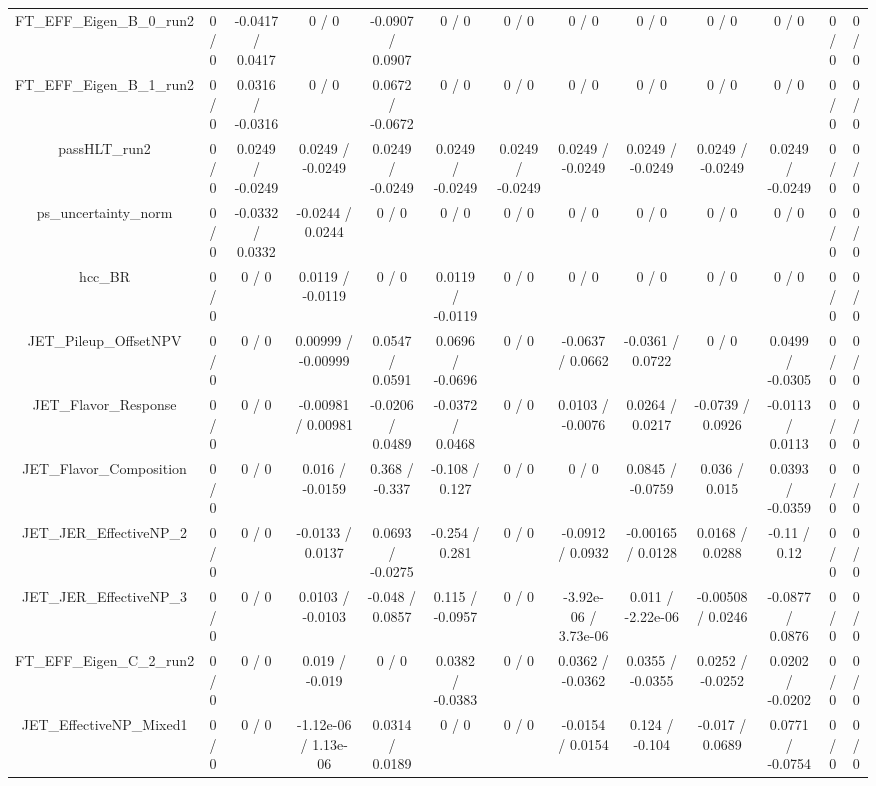 \documentclass[10pt]{article}
\begin{document}
\begin{table}[htbp]
\begin{center}
\begin{tabular}{|c|c|c|c|c|c|c|c|c|c|c|c|c|}
  FT_EFF_Eigen_B_0_run2 & 0 / 0 & -0.0417 / 0.0417 & 0 / 0 & -0.0907 / 0.0907 & 0 / 0 & 0 / 0 & 0 / 0 & 0 / 0 & 0 / 0 & 0 / 0 & 0 / 0 & 0 / 0 \\ 
  FT_EFF_Eigen_B_1_run2 & 0 / 0 & 0.0316 / -0.0316 & 0 / 0 & 0.0672 / -0.0672 & 0 / 0 & 0 / 0 & 0 / 0 & 0 / 0 & 0 / 0 & 0 / 0 & 0 / 0 & 0 / 0 \\ 
  passHLT_run2 & 0 / 0 & 0.0249 / -0.0249 & 0.0249 / -0.0249 & 0.0249 / -0.0249 & 0.0249 / -0.0249 & 0.0249 / -0.0249 & 0.0249 / -0.0249 & 0.0249 / -0.0249 & 0.0249 / -0.0249 & 0.0249 / -0.0249 & 0 / 0 & 0 / 0 \\ 
  ps_uncertainty_norm & 0 / 0 & -0.0332 / 0.0332 & -0.0244 / 0.0244 & 0 / 0 & 0 / 0 & 0 / 0 & 0 / 0 & 0 / 0 & 0 / 0 & 0 / 0 & 0 / 0 & 0 / 0 \\ 
  hcc_BR & 0 / 0 & 0 / 0 & 0.0119 / -0.0119 & 0 / 0 & 0.0119 / -0.0119 & 0 / 0 & 0 / 0 & 0 / 0 & 0 / 0 & 0 / 0 & 0 / 0 & 0 / 0 \\ 
  JET_Pileup_OffsetNPV & 0 / 0 & 0 / 0 & 0.00999 / -0.00999 & 0.0547 / 0.0591 & 0.0696 / -0.0696 & 0 / 0 & -0.0637 / 0.0662 & -0.0361 / 0.0722 & 0 / 0 & 0.0499 / -0.0305 & 0 / 0 & 0 / 0 \\ 
  JET_Flavor_Response & 0 / 0 & 0 / 0 & -0.00981 / 0.00981 & -0.0206 / 0.0489 & -0.0372 / 0.0468 & 0 / 0 & 0.0103 / -0.0076 & 0.0264 / 0.0217 & -0.0739 / 0.0926 & -0.0113 / 0.0113 & 0 / 0 & 0 / 0 \\ 
  JET_Flavor_Composition & 0 / 0 & 0 / 0 & 0.016 / -0.0159 & 0.368 / -0.337 & -0.108 / 0.127 & 0 / 0 & 0 / 0 & 0.0845 / -0.0759 & 0.036 / 0.015 & 0.0393 / -0.0359 & 0 / 0 & 0 / 0 \\ 
  JET_JER_EffectiveNP_2 & 0 / 0 & 0 / 0 & -0.0133 / 0.0137 & 0.0693 / -0.0275 & -0.254 / 0.281 & 0 / 0 & -0.0912 / 0.0932 & -0.00165 / 0.0128 & 0.0168 / 0.0288 & -0.11 / 0.12 & 0 / 0 & 0 / 0 \\ 
  JET_JER_EffectiveNP_3 & 0 / 0 & 0 / 0 & 0.0103 / -0.0103 & -0.048 / 0.0857 & 0.115 / -0.0957 & 0 / 0 & -3.92e-06 / 3.73e-06 & 0.011 / -2.22e-06 & -0.00508 / 0.0246 & -0.0877 / 0.0876 & 0 / 0 & 0 / 0 \\ 
  FT_EFF_Eigen_C_2_run2 & 0 / 0 & 0 / 0 & 0.019 / -0.019 & 0 / 0 & 0.0382 / -0.0383 & 0 / 0 & 0.0362 / -0.0362 & 0.0355 / -0.0355 & 0.0252 / -0.0252 & 0.0202 / -0.0202 & 0 / 0 & 0 / 0 \\ 
  JET_EffectiveNP_Mixed1 & 0 / 0 & 0 / 0 & -1.12e-06 / 1.13e-06 & 0.0314 / 0.0189 & 0 / 0 & 0 / 0 & -0.0154 / 0.0154 & 0.124 / -0.104 & -0.017 / 0.0689 & 0.0771 / -0.0754 & 0 / 0 & 0 / 0 \\ 

\end{tabular}
\end{center}
\end{table}
\end{document}

